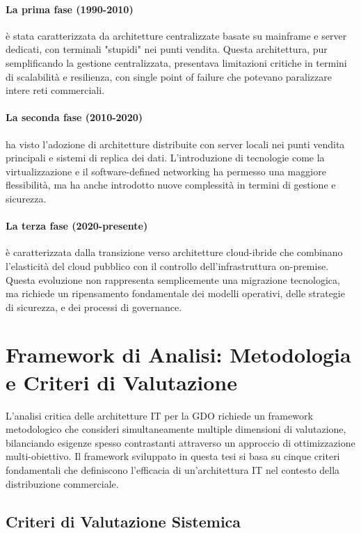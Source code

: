 \documentclass[12pt,a4paper,oneside]{book}
\begin{document}
\paragraph{La prima fase (1990-2010)} è stata caratterizzata da architetture centralizzate basate su mainframe e server dedicati, con terminali "stupidi" nei punti vendita. Questa architettura, pur semplificando la gestione centralizzata, presentava limitazioni critiche in termini di scalabilità e resilienza, con single point of failure che potevano paralizzare intere reti commerciali.

\paragraph{La seconda fase (2010-2020)} ha visto l'adozione di architetture distribuite con server locali nei punti vendita principali e sistemi di replica dei dati. L'introduzione di tecnologie come la virtualizzazione e il software-defined networking ha permesso una maggiore flessibilità, ma ha anche introdotto nuove complessità in termini di gestione e sicurezza.

\paragraph{La terza fase (2020-presente)} è caratterizzata dalla transizione verso architetture cloud-ibride che combinano l'elasticità del cloud pubblico con il controllo dell'infrastruttura on-premise. Questa evoluzione non rappresenta semplicemente una migrazione tecnologica, ma richiede un ripensamento fondamentale dei modelli operativi, delle strategie di sicurezza, e dei processi di governance.

\section{Framework di Analisi: Metodologia e Criteri di Valutazione}
\label{sec:framework}

L'analisi critica delle architetture IT per la GDO richiede un framework metodologico che consideri simultaneamente multiple dimensioni di valutazione, bilanciando esigenze spesso contrastanti attraverso un approccio di ottimizzazione multi-obiettivo. Il framework sviluppato in questa tesi si basa su cinque criteri fondamentali che definiscono l'efficacia di un'architettura IT nel contesto della distribuzione commerciale.

\subsection{Criteri di Valutazione Sistemica}
\label{ssec:criteri_valutazione}
\end{document}

